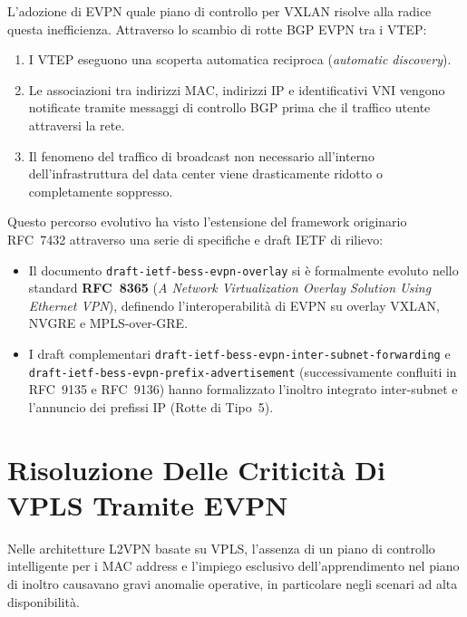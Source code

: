 \documentclass[11pt, a4paper]{article}
\begin{document}
L'adozione di EVPN quale piano di controllo per VXLAN risolve alla radice questa inefficienza. Attraverso lo scambio di rotte BGP EVPN tra i VTEP:
\begin{enumerate}[noitemsep]
    \item I VTEP eseguono una scoperta automatica reciproca (\emph{automatic discovery}).
    \item Le associazioni tra indirizzi MAC, indirizzi IP e identificativi VNI vengono notificate tramite messaggi di controllo BGP prima che il traffico utente attraversi la rete.
    \item Il fenomeno del traffico di broadcast non necessario all'interno dell'infrastruttura del data center viene drasticamente ridotto o completamente soppresso.
\end{enumerate}

Questo percorso evolutivo ha visto l'estensione del framework originario RFC~7432 attraverso una serie di specifiche e draft IETF di rilievo:
\begin{itemize}[noitemsep]
    \item Il documento \texttt{draft-ietf-bess-evpn-overlay} si è formalmente evoluto nello standard \textbf{RFC~8365} (\emph{A Network Virtualization Overlay Solution Using Ethernet VPN}), definendo l'interoperabilità di EVPN su overlay VXLAN, NVGRE e MPLS-over-GRE.
    \item I draft complementari \texttt{draft-ietf-bess-evpn-inter-subnet-forwarding} e \texttt{draft-ietf-bess-evpn-prefix-advertisement} (successivamente confluiti in RFC~9135 e RFC~9136) hanno formalizzato l'inoltro integrato inter-subnet e l'annuncio dei prefissi IP (Rotte di Tipo~5).
\end{itemize}


\section{Risoluzione Delle Criticità Di VPLS Tramite EVPN}

Nelle architetture L2VPN basate su VPLS, l'assenza di un piano di controllo intelligente per i MAC address e l'impiego esclusivo dell'apprendimento nel piano di inoltro causavano gravi anomalie operative, in particolare negli scenari ad alta disponibilità.
\end{document}

